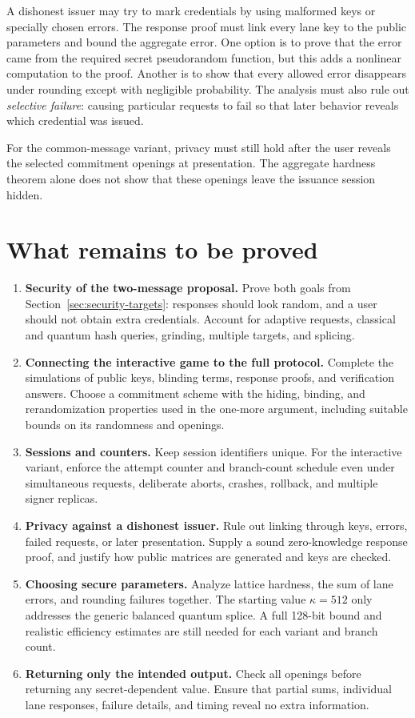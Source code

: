 \documentclass[10pt]{article}
\begin{document}
A dishonest issuer may try to mark credentials by using malformed keys or
specially chosen errors.  The response proof must link every lane key to the
public parameters and bound the aggregate error.  One option is to prove
that the error came from the required secret pseudorandom function, but this
adds a nonlinear computation to the proof.  Another is to show that every
allowed error disappears under rounding except with negligible probability.
The analysis must also rule out \emph{selective failure}: causing particular
requests to fail so that later behavior reveals which credential was issued.

For the common-message variant, privacy must still hold after the user
reveals the selected commitment openings at presentation.  The aggregate
hardness theorem alone does not show that these openings leave the issuance
session hidden.

\section{What remains to be proved}\label{sec:open}

\begin{enumerate}
 \item \textbf{Security of the two-message proposal.} Prove both goals from
Section~\ref{sec:security-targets}: responses should look random, and a user
should not obtain extra credentials.  Account for adaptive requests,
classical and quantum hash queries, grinding, multiple targets, and splicing.
 \item \textbf{Connecting the interactive game to the full protocol.}
Complete the simulations of public keys, blinding terms, response proofs,
and verification answers.  Choose a commitment scheme with the hiding,
binding, and rerandomization properties used in the one-more argument,
including suitable bounds on its randomness and openings.
 \item \textbf{Sessions and counters.} Keep session identifiers unique.
For the interactive variant, enforce the attempt counter and branch-count
schedule even under simultaneous requests, deliberate aborts, crashes,
rollback, and multiple signer replicas.
 \item \textbf{Privacy against a dishonest issuer.} Rule out linking through
keys, errors, failed requests, or later presentation.  Supply a sound
zero-knowledge response proof, and justify how public matrices are generated
and keys are checked.
 \item \textbf{Choosing secure parameters.} Analyze lattice hardness, the
sum of lane errors, and rounding failures together.  The starting value
$\kappa=512$ only addresses the generic balanced quantum splice.  A full
128-bit bound and realistic efficiency estimates are still needed for each
variant and branch count.
 \item \textbf{Returning only the intended output.} Check all openings before
returning any secret-dependent value.  Ensure that partial sums, individual
lane responses, failure details, and timing reveal no extra information.
\end{enumerate}
\end{document}
